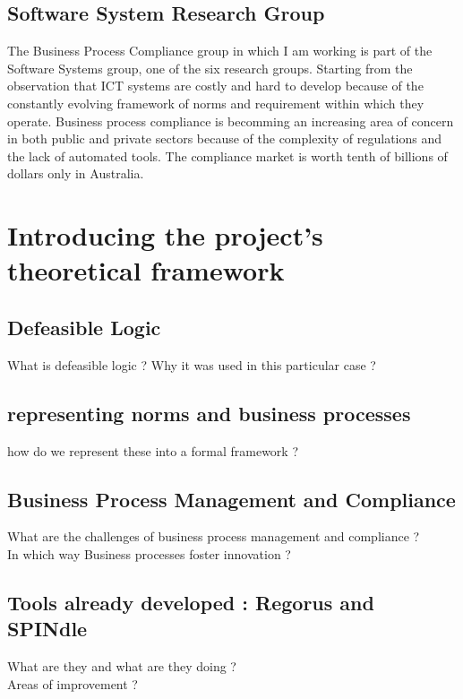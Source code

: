 \documentclass[10pt]{article}
\begin{document}
\subsection{Software System Research Group}

The Business Process Compliance group in which I am working is part of the Software Systems group, one of the six research groups. Starting from the observation that ICT systems are costly and hard to develop because of the constantly evolving framework of norms and requirement within which they operate. Business process compliance is becomming an increasing area of concern in both public and private sectors because of the complexity of regulations and the lack of automated tools. The compliance market is worth tenth of billions of dollars only in Australia.\autocite{BPCWebsite}






\newpage

\section{Introducing the project's theoretical framework}
\subsection{Defeasible Logic}
What is defeasible logic ?
Why it was used in this particular case ?

\subsection{representing norms and business processes}
how do we represent these into a formal framework ?
\lipsum[1-25]

\subsection{Business Process Management and Compliance}
What are the challenges of business process management and compliance ?\\
In which way Business processes foster innovation ?

\subsection{Tools already developed : Regorus and SPINdle}
What are they and what are they doing ?\\
Areas of improvement ?
\end{document}
